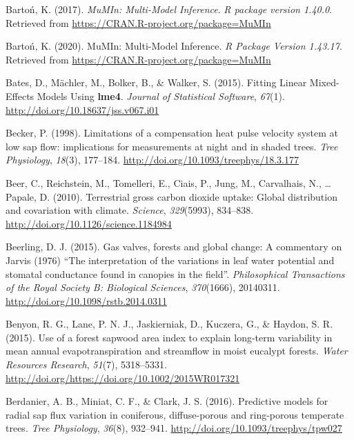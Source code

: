\documentclass[11pt,twoside]{reedthesis}
\begin{document}
\hypertarget{ref-Barton2017}{}
Bartoń, K. (2017). \emph{MuMIn: Multi-Model Inference}. \emph{R package
version 1.40.0}. Retrieved from
\url{https://CRAN.R-project.org/package=MuMIn}

\hypertarget{ref-barton_mumin_2020}{}
Bartoń, K. (2020). MuMIn: Multi-Model Inference. \emph{R Package Version
1.43.17}. Retrieved from \url{https://CRAN.R-project.org/package=MuMIn}

\hypertarget{ref-Bates2015}{}
Bates, D., Mächler, M., Bolker, B., \& Walker, S. (2015). Fitting Linear
Mixed-Effects Models Using \textbf{lme4}. \emph{Journal of Statistical
Software}, \emph{67}(1). \url{http://doi.org/10.18637/jss.v067.i01}

\hypertarget{ref-Becker1998}{}
Becker, P. (1998). Limitations of a compensation heat pulse velocity
system at low sap flow: implications for measurements at night and in
shaded trees. \emph{Tree Physiology}, \emph{18}(3), 177--184.
\url{http://doi.org/10.1093/treephys/18.3.177}

\hypertarget{ref-Beer2010}{}
Beer, C., Reichstein, M., Tomelleri, E., Ciais, P., Jung, M.,
Carvalhais, N., \ldots{} Papale, D. (2010). Terrestrial gross carbon
dioxide uptake: Global distribution and covariation with climate.
\emph{Science}, \emph{329}(5993), 834--838.
\url{http://doi.org/10.1126/science.1184984}

\hypertarget{ref-beerling_gas_2015}{}
Beerling, D. J. (2015). Gas valves, forests and global change: A
commentary on Jarvis (1976) ``The interpretation of the variations in
leaf water potential and stomatal conductance found in canopies in the
field''. \emph{Philosophical Transactions of the Royal Society B:
Biological Sciences}, \emph{370}(1666), 20140311.
\url{http://doi.org/10.1098/rstb.2014.0311}

\hypertarget{ref-Benyon2015}{}
Benyon, R. G., Lane, P. N. J., Jaskierniak, D., Kuczera, G., \& Haydon,
S. R. (2015). Use of a forest sapwood area index to explain long-term
variability in mean annual evapotranspiration and streamflow in moist
eucalypt forests. \emph{Water Resources Research}, \emph{51}(7),
5318--5331. \url{http://doi.org/https://doi.org/10.1002/2015WR017321}

\hypertarget{ref-Berdanier2016}{}
Berdanier, A. B., Miniat, C. F., \& Clark, J. S. (2016). Predictive
models for radial sap flux variation in coniferous, diffuse-porous and
ring-porous temperate trees. \emph{Tree Physiology}, \emph{36}(8),
932--941. \url{http://doi.org/10.1093/treephys/tpw027}
\end{document}
